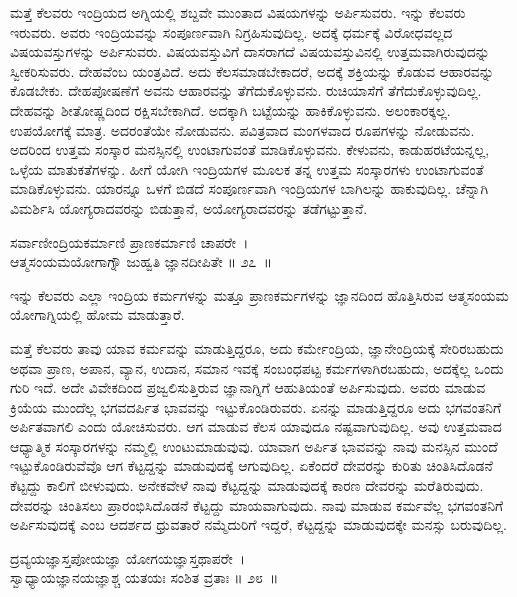 ಮತ್ತೆ ಕೆಲವರು ಇಂದ್ರಿಯದ ಅಗ್ನಿಯಲ್ಲಿ ಶಬ್ದವೇ ಮುಂತಾದ ವಿಷಯಗಳನ್ನು ಅರ್ಪಿಸುವರು. ಇನ್ನು ಕೆಲವರು ಇರುವರು. ಅವರು ಇಂದ್ರಿಯವನ್ನು ಸಂಪೂರ್ಣವಾಗಿ ನಿಗ್ರಹಿಸುವುದಿಲ್ಲ. ಅದಕ್ಕೆ ಧರ್ಮಕ್ಕೆ ವಿರೋಧವಲ್ಲದ ವಿಷಯವಸ್ತುಗಳನ್ನು ಅರ್ಪಿಸುವರು. ವಿಷಯವಸ್ತುವಿಗೆ ದಾಸರಾಗದೆ ವಿಷಯವಸ್ತುವಿನಲ್ಲಿ ಉತ್ತಮವಾಗಿರುವುದನ್ನು ಸ್ವೀಕರಿಸುವರು. ದೇಹವೆಂಬ ಯಂತ್ರವಿದೆ. ಅದು ಕೆಲಸಮಾಡಬೇಕಾದರೆ, ಅದಕ್ಕೆ ಶಕ್ತಿಯನ್ನು ಕೊಡುವ ಆಹಾರವನ್ನು ಕೊಡಬೇಕು. ದೇಹಪೋಷಣೆಗೆ ಅವನು ಆಹಾರವನ್ನು ತೆಗೆದುಕೊಳ್ಳುವನು. ರುಚಿಯಾಸೆಗೆ ತೆಗೆದುಕೊಳ್ಳುವುದಿಲ್ಲ. ದೇಹವನ್ನು ಶೀತೋಷ್ಣದಿಂದ ರಕ್ಷಿಸಬೇಕಾಗಿದೆ. ಅದಕ್ಕಾಗಿ ಬಟ್ಟೆಯನ್ನು ಹಾಕಿಕೊಳ್ಳುವನು. ಅಲಂಕಾರಕ್ಕಲ್ಲ. ಉಪಯೋಗಕ್ಕೆ ಮಾತ್ರ. ಅದರಂತೆಯೇ ನೋಡುವನು. ಪವಿತ್ರವಾದ ಮಂಗಳವಾದ ರೂಪಗಳನ್ನು ನೋಡುವನು. ಅದರಿಂದ ಉತ್ತಮ ಸಂಸ್ಕಾರ ಮನಸ್ಸಿನಲ್ಲಿ ಉಂಟಾಗುವಂತೆ ಮಾಡಿಕೊಳ್ಳುವನು. ಕೇಳುವನು, ಕಾಡುಹರಟೆಯನ್ನಲ್ಲ, ಒಳ್ಳೆಯ ಮಾತುಕತೆಗಳನ್ನು. ಹೀಗೆ ಯೋಗಿ ಇಂದ್ರಿಯಗಳ ಮೂಲಕ ತನ್ನ ಉತ್ತಮ ಸಂಸ್ಕಾರಗಳು ಉಂಟಾಗುವಂತೆ ಮಾಡಿಕೊಳ್ಳುವನು. ಯಾರನ್ನೂ ಒಳಗೆ ಬಿಡದೆ ಸಂಪೂರ್ಣವಾಗಿ ಇಂದ್ರಿಯಗಳ ಬಾಗಿಲನ್ನು ಹಾಕುವುದಿಲ್ಲ. ಚೆನ್ನಾಗಿ ವಿಮರ್ಶಿಸಿ ಯೋಗ್ಯರಾದವರನ್ನು ಬಿಡುತ್ತಾನೆ, ಅಯೋಗ್ಯರಾದವರನ್ನು ತಡೆಗಟ್ಟುತ್ತಾನೆ.

\begin{shloka}
ಸರ್ವಾಣೀಂದ್ರಿಯಕರ್ಮಾಣಿ ಪ್ರಾಣಕರ್ಮಾಣಿ ಚಾಪರೇ~।\\ಆತ್ಮಸಂಯಮಯೋಗಾಗ್ನೌ ಜುಹ್ವತಿ ಜ್ಞಾನದೀಪಿತೇ \hfill॥ ೨೭~॥
\end{shloka}

\begin{artha}
ಇನ್ನು ಕೆಲವರು ಎಲ್ಲಾ ಇಂದ್ರಿಯ ಕರ್ಮಗಳನ್ನು ಮತ್ತೂ ಪ್ರಾಣಕರ್ಮಗಳನ್ನು ಜ್ಞಾನದಿಂದ ಹೊತ್ತಿಸಿರುವ ಆತ್ಮಸಂಯಮ ಯೋಗಾಗ್ನಿಯಲ್ಲಿ ಹೋಮ ಮಾಡುತ್ತಾರೆ.
\end{artha}

ಮತ್ತೆ ಕೆಲವರು ತಾವು ಯಾವ ಕರ್ಮವನ್ನು ಮಾಡುತ್ತಿದ್ದರೂ, ಅದು ಕರ್ಮೇಂದ್ರಿಯ, ಜ್ಞಾನೇಂದ್ರಿಯಕ್ಕೆ ಸೇರಿರಬಹುದು ಅಥವಾ ಪ್ರಾಣ, ಅಪಾನ, ವ್ಯಾನ, ಉದಾನ, ಸಮಾನ ಇವಕ್ಕೆ ಸಂಬಂಧಪಟ್ಟ ಕರ್ಮಗಳಾಗಿರಬಹುದು, ಅದಕ್ಕೆಲ್ಲ ಒಂದು ಗುರಿ ಇದೆ. ಅದೇ ವಿವೇಕದಿಂದ ಪ್ರಜ್ವಲಿಸುತ್ತಿರುವ ಜ್ಞಾನಾಗ್ನಿಗೆ ಆಹುತಿಯಂತೆ ಅರ್ಪಿಸುವುದು. ಅವರು ಮಾಡುವ ಕ್ರಿಯೆಯ ಮುಂದೆಲ್ಲ ಭಗವದರ್ಪಿತ ಭಾವವನ್ನು ಇಟ್ಟುಕೊಂಡಿರುವರು. ಏನನ್ನು ಮಾಡುತ್ತಿದ್ದರೂ ಅದು ಭಗವಂತನಿಗೆ ಅರ್ಪಿತವಾಗಲಿ ಎಂದು ಯೋಚಿಸುವರು. ಆಗ ಮಾಡುವ ಕೆಲಸ ಯಾವುದೂ ನಷ್ಟವಾಗುವುದಿಲ್ಲ. ಅವು ಉತ್ತಮವಾದ ಆಧ್ಯಾತ್ಮಿಕ ಸಂಸ್ಕಾರಗಳನ್ನು ನಮ್ಮಲ್ಲಿ ಉಂಟುಮಾಡುವುವು. ಯಾವಾಗ ಅರ್ಪಿತ ಭಾವವನ್ನು ನಾವು ಮನಸ್ಸಿನ ಮುಂದೆ ಇಟ್ಟುಕೊಂಡಿರುವೆವೊ ಆಗ ಕೆಟ್ಟದ್ದನ್ನು ಮಾಡುವುದಕ್ಕೆ ಆಗುವುದಿಲ್ಲ. ಏಕೆಂದರೆ ದೇವರನ್ನು ಕುರಿತು ಚಿಂತಿಸಿದೊಡನೆ ಕೆಟ್ಟದ್ದು ಕಾಲಿಗೆ ಬೀಳುವುದು. ಅನೇಕವೇಳೆ ನಾವು ಕೆಟ್ಟದ್ದನ್ನು ಮಾಡುವುದಕ್ಕೆ ಕಾರಣ ದೇವರನ್ನು ಮರೆತಿರುವುದು. ದೇವರನ್ನು ಚಿಂತಿಸಲು ಪ್ರಾರಂಭಿಸಿದೊಡನೆ ಕೆಟ್ಟದ್ದು ಮಾಯವಾಗುವುದು. ನಾವು ಮಾಡುವ ಕರ್ಮವೆಲ್ಲ ಭಗವಂತನಿಗೆ ಅರ್ಪಿಸುವುದಕ್ಕೆ ಎಂಬ ಆದರ್ಶದ ಧ್ರುವತಾರೆ ನಮ್ಮೆದುರಿಗೆ ಇದ್ದರೆ, ಕೆಟ್ಟದ್ದನ್ನು ಮಾಡುವುದಕ್ಕೇ ಮನಸ್ಸು ಬರುವುದಿಲ್ಲ.

\begin{shloka}
ದ್ರವ್ಯಯಜ್ಞಾಸ್ತಪೋಯಜ್ಞಾ ಯೋಗಯಜ್ಞಾಸ್ತಥಾಪರೇ~।\\ಸ್ವಾಧ್ಯಾಯಜ್ಞಾನಯಜ್ಞಾಶ್ಚ ಯತಯಃ ಸಂಶಿತ ವ್ರತಾಃ \hfill॥ ೨೮~॥
\end{shloka}

